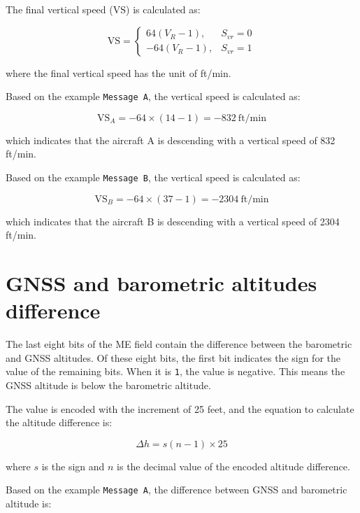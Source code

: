 The final vertical speed ($\mathrm{VS}$) is calculated as:

\begin{equation}
  \mathrm{VS} =   
   \begin{cases}
     64 (V_R - 1), & S_{vr} = 0 \\
     -64 (V_R - 1), & S_{vr} = 1
   \end{cases}
\end{equation}

where the final vertical speed has the unit of ft/min.

Based on the example \texttt{Message A}, the vertical speed is calculated as:

\begin{equation}
  \mathrm{VS}_A = -64 \times (14 - 1) = -832 ~\text{ft/min}
\end{equation}

which indicates that the aircraft A is descending with a vertical speed of 832 ft/min.

Based on the example \texttt{Message B}, the vertical speed is calculated as:

\begin{equation}
  \mathrm{VS}_B = -64 \times (37 - 1) = -2304 ~\text{ft/min}
\end{equation}

which indicates that the aircraft B is descending with a vertical speed of 2304 ft/min.


\section{GNSS and barometric altitudes difference}

The last eight bits of the ME field contain the difference between the barometric and GNSS altitudes. Of these eight bits, the first bit indicates the sign for the value of the remaining bits. When it is \texttt{1}, the value is negative. This means the GNSS altitude is below the barometric altitude.

The value is encoded with the increment of 25 feet, and the equation to calculate the altitude difference is:

\begin{equation}
  \Delta h = s (n - 1) \times 25
\end{equation}

where $s$ is the sign and $n$ is the decimal value of the encoded altitude difference.

Based on the example \texttt{Message A}, the difference between GNSS and barometric altitude is:

